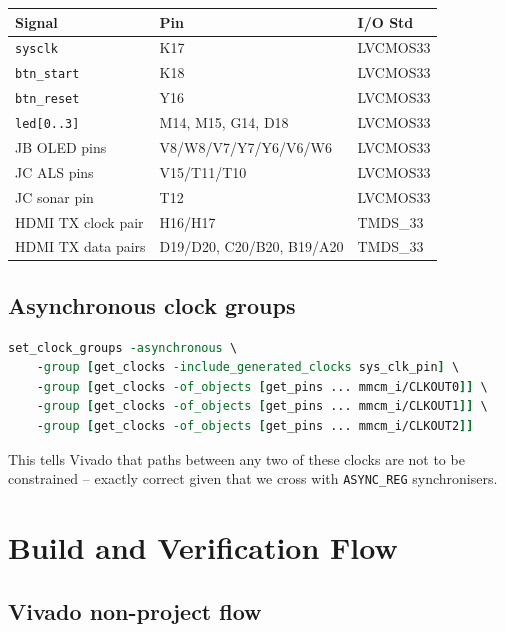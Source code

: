 \documentclass[11pt,a4paper]{article}
\begin{document}
\begin{table}[h]
\centering
\begin{tabular}{@{}lll@{}}
\toprule
Signal              & Pin   & I/O Std       \\
\midrule
\texttt{sysclk}     & K17   & LVCMOS33      \\
\texttt{btn\_start} & K18   & LVCMOS33      \\
\texttt{btn\_reset} & Y16   & LVCMOS33      \\
\texttt{led[0..3]}  & M14, M15, G14, D18 & LVCMOS33 \\
JB OLED pins        & V8/W8/V7/Y7/Y6/V6/W6 & LVCMOS33 \\
JC ALS pins         & V15/T11/T10 & LVCMOS33 \\
JC sonar pin        & T12   & LVCMOS33      \\
HDMI TX clock pair  & H16/H17 & TMDS\_33   \\
HDMI TX data pairs  & D19/D20, C20/B20, B19/A20 & TMDS\_33 \\
\bottomrule
\end{tabular}
\end{table}

\subsection{Asynchronous clock groups}

\begin{lstlisting}[language=tcl, caption={CDC handling in the XDC.}]
set_clock_groups -asynchronous \
    -group [get_clocks -include_generated_clocks sys_clk_pin] \
    -group [get_clocks -of_objects [get_pins ... mmcm_i/CLKOUT0]] \
    -group [get_clocks -of_objects [get_pins ... mmcm_i/CLKOUT1]] \
    -group [get_clocks -of_objects [get_pins ... mmcm_i/CLKOUT2]]
\end{lstlisting}

This tells Vivado that paths between any two of these clocks are not
to be constrained -- exactly correct given that we cross with
\texttt{ASYNC\_REG} synchronisers.

\section{Build and Verification Flow}

\subsection{Vivado non-project flow}
\end{document}
